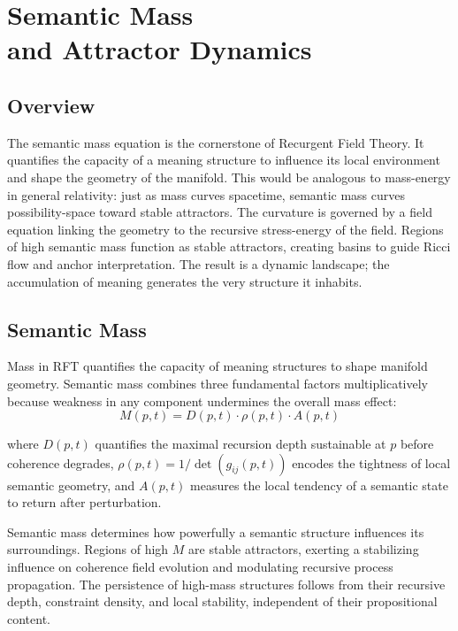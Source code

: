 \chapter{Semantic Mass \\ and Attractor Dynamics}

\section{Overview}

The semantic mass equation is the cornerstone of Recurgent Field Theory. It quantifies the capacity of a meaning structure to influence its local environment and shape the geometry of the manifold. This would be analogous to mass-energy in general relativity: just as mass curves spacetime, semantic mass curves possibility-space toward stable attractors. The curvature is governed by a field equation linking the geometry to the recursive stress-energy of the field. Regions of high semantic mass function as stable attractors, creating basins to guide Ricci flow and anchor interpretation. The result is a dynamic landscape; the accumulation of meaning generates the very structure it inhabits.

\section{Semantic Mass}

Mass in RFT quantifies the capacity of meaning structures to shape manifold geometry. Semantic mass combines three fundamental factors multiplicatively because weakness in any component undermines the overall mass effect:
\begin{equation}
M(p, t) = D(p, t) \cdot \rho(p, t) \cdot A(p, t)
\end{equation}

where \(D(p, t)\) quantifies the maximal recursion depth sustainable at \(p\) before coherence degrades, \(\rho(p, t) = 1/\det(g_{ij}(p, t))\) encodes the tightness of local semantic geometry, and \(A(p, t)\) measures the local tendency of a semantic state to return after perturbation.

Semantic mass determines how powerfully a semantic structure influences its surroundings. Regions of high \(M\) are stable attractors, exerting a stabilizing influence on coherence field evolution and modulating recursive process propagation. The persistence of high-mass structures follows from their recursive depth, constraint density, and local stability, independent of their propositional content.

